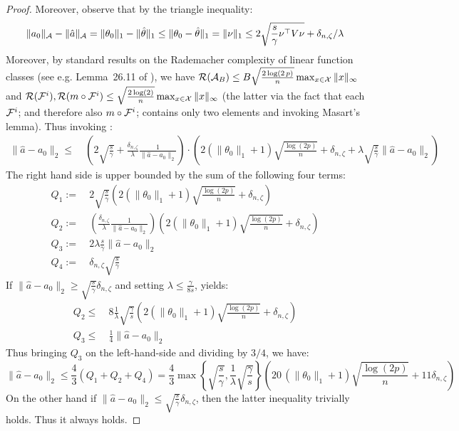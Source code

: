 \begin{proof}
Moreover, observe that by the triangle inequality:
\begin{equation}
    \|a_0\|_{{\mathcal A}} - \|\hat{a}\|_{{\mathcal A}} = \|\theta_0\|_1 - \|\hat{\theta}\|_1 \leq \|\theta_0-\hat{\theta}\|_1 = \|\nu\|_1 \leq 2 \sqrt{\frac{s}{\gamma} \nu^\top  V \nu}  + \delta_{n,\zeta}/\lambda 
\end{equation}
Moreover, by standard results on the Rademacher complexity of linear function classes (see e.g. Lemma~26.11 of \cite{shalev2014understanding}), we have ${\mathcal R}({\mathcal A}_B)\leq B\sqrt{\frac{2\log(2\, p)}{n}}\max_{x\in {\mathcal X}} \|x\|_{\infty}$ and ${\mathcal R}({\mathcal F}^i), {\mathcal R}(m\circ {\mathcal F}^i)\leq \sqrt{\frac{2\log(2)}{n}}\max_{x\in {\mathcal X}} \|x\|_{\infty}$ (the latter via the fact that each ${\mathcal F}^i$; and therefore also $m\circ {\mathcal F}^i$; contains only two elements and invoking Masart's lemma). Thus invoking :
\begin{align}
    \|\hat{a}-a_0\|_2 \leq~& \left(2\sqrt{\frac{s}{\gamma}} + \frac{\delta_{n,\zeta}}{\lambda} \frac{1}{\|\hat{a}-a_0\|_2}\right)\cdot \left(2 (\|\theta_0\|_{1}+1) \sqrt{\frac{\log(2p)}{n}} + \delta_{n,\zeta} + \lambda \sqrt{\frac{s}{\gamma}} \|\hat{a}-a_0\|_2\right)
\end{align} 
The right hand side is upper bounded by the sum of the following four terms:
\begin{align}
    Q_1 :=~& 2\sqrt{\frac{s}{\gamma}} \left(2(\|\theta_0\|_1+1) \sqrt{\frac{\log(2p)}{n}} + \delta_{n,\zeta}\right)\\
    Q_2 :=~& \left(\frac{\delta_{n,\zeta}}{\lambda} \frac{1}{\|\hat{a}-a_0\|_2}\right)\left(2 (\|\theta_0\|_1+1) \sqrt{\frac{\log(2p)}{n}} + \delta_{n,\zeta} \right)\\
    Q_3 :=~& 2 \lambda \frac{s}{\gamma} \|\hat{a}-a_0\|_2\\
    Q_4 :=~& \delta_{n,\zeta} \sqrt{\frac{s}{\gamma}}
\end{align}
If $\|\hat{a}-a_0\|_2 \geq \sqrt{\frac{s}{\gamma}} \delta_{n,\zeta}$ and setting $\lambda \leq \frac{\gamma}{8s}$, yields:
\begin{align}
    Q_2 \leq~& 8 \frac{1}{\lambda}\sqrt{\frac{\gamma}{s}}\left(2 (\|\theta_0\|_1+1) \sqrt{\frac{\log(2p)}{n}} + \delta_{n,\zeta} \right)\\
    Q_3 \leq~& \frac{1}{4} \|\hat{a}-a_0\|_2
\end{align}
Thus bringing $Q_3$ on the left-hand-side and dividing by $3/4$, we have:
\begin{equation}
    \|\hat{a}-a_0\|_2 \leq \frac{4}{3} (Q_1 + Q_2 + Q_4) = \frac{4}{3}\max\left\{\sqrt{\frac{s}{\gamma}}, \frac{1}{\lambda} \sqrt{\frac{\gamma}{s}}\right\} \left(20\, (\|\theta_0\|_1+1) \sqrt{\frac{\log(2p)}{n}} + 11 \delta_{n,\zeta}\right)
\end{equation}
On the other hand if $\|\hat{a}-a_0\|_2\leq \sqrt{\frac{s}{\gamma}} \delta_{n,\zeta}$, then the latter inequality trivially holds. Thus it always holds.
\end{proof}